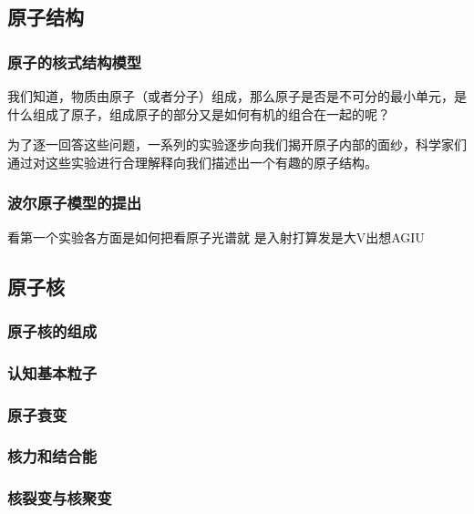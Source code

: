 \begin{issues}
\issueTODO
\end{issues}

\subsection{原子结构}
\subsubsection{原子的核式结构模型}
我们知道，物质由原子（或者分子）组成，那么原子是否是不可分的最小单元，是什么组成了原子，组成原子的部分又是如何有机的组合在一起的呢？

为了逐一回答这些问题，一系列的实验逐步向我们揭开原子内部的面纱，科学家们通过对这些实验进行合理解释向我们描述出一个有趣的原子结构。
\subsubsection{波尔原子模型的提出}%
看第一个实验各方面是如何把看原子光谱就 是入射打算发是大V出想AGIU
\subsection{原子核}
\subsubsection{原子核的组成}
\subsubsection{认知基本粒子}
\subsubsection{原子衰变}
\subsubsection{核力和结合能}
\subsubsection{核裂变与核聚变}